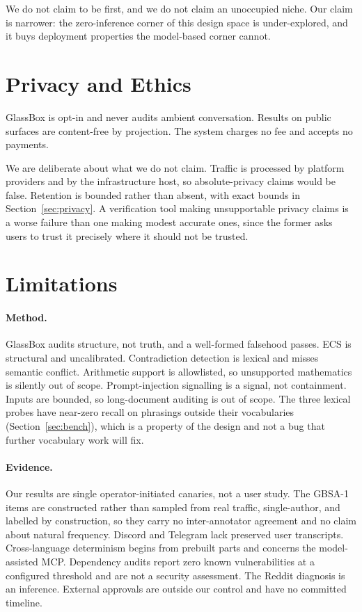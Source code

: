 We do not claim to be first, and we do not claim an unoccupied niche. Our claim is narrower:
the zero-inference corner of this design space is under-explored, and it buys deployment
properties the model-based corner cannot.

\section{Privacy and Ethics}

GlassBox is opt-in and never audits ambient conversation. Results on public surfaces are
content-free by projection. The system charges no fee and accepts no payments.

We are deliberate about what we do not claim. Traffic is processed by platform providers and
by the infrastructure host, so absolute-privacy claims would be false. Retention is bounded
rather than absent, with exact bounds in Section~\ref{sec:privacy}. A verification tool
making unsupportable privacy claims is a worse failure than one making modest accurate ones,
since the former asks users to trust it precisely where it should not be trusted.

\section{Limitations}
\label{sec:limits}

\paragraph{Method.}
GlassBox audits structure, not truth, and a well-formed falsehood passes. ECS is structural
and uncalibrated. Contradiction detection is lexical and misses semantic conflict. Arithmetic
support is allowlisted, so unsupported mathematics is silently out of scope.
Prompt-injection signalling is a signal, not containment. Inputs are bounded, so
long-document auditing is out of scope. The three lexical probes have near-zero recall on
phrasings outside their vocabularies (Section~\ref{sec:bench}), which is a property of the
design and not a bug that further vocabulary work will fix.

\paragraph{Evidence.}
Our  results are single operator-initiated canaries, not a user study. The GBSA-1
items are constructed rather than sampled from real traffic, single-author, and labelled by
construction, so they carry no inter-annotator agreement and no claim about natural
frequency. Discord and Telegram lack preserved user transcripts. Cross-language determinism begins from prebuilt
parts and concerns the model-assisted MCP. Dependency audits report zero known
vulnerabilities at a configured threshold and are not a security assessment. The Reddit
diagnosis is an inference. External approvals are outside our control and have no committed
timeline.

